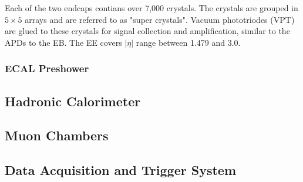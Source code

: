 \vspace{0.3cm}
Each of the two endcaps contians over 7,000 crystals. The crystals are grouped in $5\times 5$ arrays and are referred to as "super crystals". Vacuum phototriodes (VPT) are glued to these crystals for signal collection and amplification, similar to the APDs to the EB. The EE covers $|\eta|$ range between 1.479 and 3.0. 

\subsubsection{ECAL Preshower}

\subsection{Hadronic Calorimeter} 
\subsection{Muon Chambers} 
\subsection{Data Acquisition and Trigger System} 
